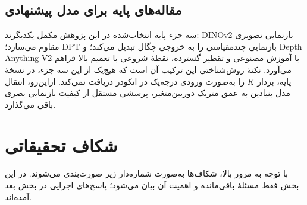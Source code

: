 \subsection{مقاله‌های پایه برای مدل پیشنهادی}
سه جزء پایهٔ انتخاب‌شده در این پژوهش مکمل یکدیگرند: DINOv2 بازنمایی تصویری مقاوم می‌سازد؛ DPT بازنمایی چندمقیاسی را به خروجی چگال تبدیل می‌کند؛ و Depth Anything V2 با آموزش مصنوعی و تقطیر گسترده، نقطهٔ شروعی با تعمیم بالا فراهم می‌آورد. نکتهٔ روش‌شناختی این ترکیب آن است که هیچ‌یک از این سه جزء، در نسخهٔ پایه، بردار $K$ را به‌صورت ورودی درجه‌یک در انکودر دریافت نمی‌کند. ازاین‌رو، انتقال مدل بنیادین به عمق متریک دوربین‌متغیر، پرسشی مستقل از کیفیت بازنمایی بصری باقی می‌گذارد.

\section{شکاف تحقیقاتی}
\label{sec:ch2_gap}
با توجه به مرور بالا، شکاف‌ها به‌صورت شماره‌دار زیر صورت‌بندی می‌شوند. در این بخش فقط مسئلهٔ باقی‌مانده و اهمیت آن بیان می‌شود؛ پاسخ‌های اجرایی در بخش بعد آمده‌اند.

